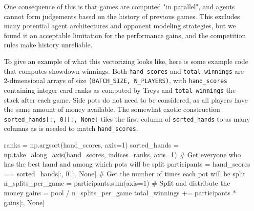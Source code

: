 One consequence of this is that games are computed "in parallel", and agents cannot form judgements based on the history of previous games. This excludes many potential agent architectures and opponent modeling strategies, but we found it an acceptable limitation for the performance gains, and the competition rules make history unreliable.

To give an example of what this vectorizing looks like, here is some example code that computes showdown winnings. Both \verb{hand_scores{ and \verb{total_winnings{ are 2-dimensional arrays of size \verb{(BATCH_SIZE, N_PLAYERS){, with \verb{hand_scores{ containing integer card ranks as computed by Treys and \verb{total_winnings{ the stack after each game. Side pots do not need to be considered, as all players have the same amount of money available. The somewhat exotic construction \verb{sorted_hands[:, 0][:, None]{ tiles the first column of \verb{sorted_hands{ to as many columns as is needed to match \verb{hand_scores{.
\begin{code}
ranks = np.argsort(hand_scores, axis=1)
sorted_hands = np.take_along_axis(hand_scores, indices=ranks, axis=1)
# Get everyone who has the best hand and among which pots will be split
participants = hand_scores == sorted_hands[:, 0][:, None]
# Get the number of times each pot will be split
n_splits_per_game = participants.sum(axis=1)
# Split and distribute the money
gains = pool / n_splits_per_game
total_winnings += participants * gains[:, None]
\end{code}